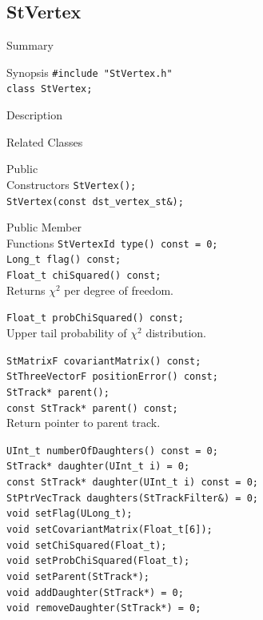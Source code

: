 \documentclass[twoside]{article}
\begin{document}
\begin{figure}[htb]
\begin{center}
\subsection{StVertex}
\label{sec:StVertex}
\item[Summary]
\item[Synopsis]
    \verb+#include "StVertex.h"+\\
    \verb+class StVertex;+\\
\item[Description]
\item[Related Classes]
\item[Public\\ Constructors]
    \verb+StVertex();+\\
    \verb+StVertex(const dst_vertex_st&);+\\
\item[Public Member\\ Functions]
    \verb+StVertexId type() const = 0;+\\

    \verb+Long_t flag() const;+\\

    \verb+Float_t chiSquared() const;+\\
    Returns $\chi^2$ per degree of freedom. 

    \verb+Float_t probChiSquared() const;+\\
    Upper tail probability of $\chi^2$ distribution.

    \verb+StMatrixF covariantMatrix() const;+\\

    \verb+StThreeVectorF positionError() const;+\\
    
    \verb+StTrack* parent();+\\
    \verb+const StTrack* parent() const;+\\
    Return pointer to parent track.
    
    \verb+UInt_t numberOfDaughters() const = 0;+\\

    \verb+StTrack* daughter(UInt_t i) = 0;+\\
    \verb+const StTrack* daughter(UInt_t i) const = 0;+\\

    \verb+StPtrVecTrack daughters(StTrackFilter&) = 0;+\\

    \verb+void setFlag(ULong_t);+\\
    \verb+void setCovariantMatrix(Float_t[6]);+\\
    \verb+void setChiSquared(Float_t);+\\
    \verb+void setProbChiSquared(Float_t);+\\
    \verb+void setParent(StTrack*);+\\
    \verb+void addDaughter(StTrack*) = 0;+\\
    \verb+void removeDaughter(StTrack*) = 0;+\\


\end{center}
\end{figure}
\end{document}
